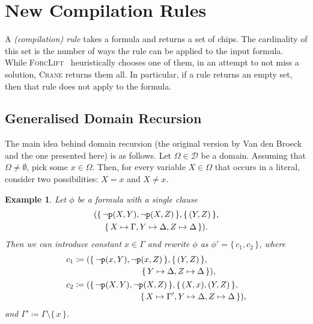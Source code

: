 \documentclass{article}
\newtheorem{example}{Example}
\newcommand{\predicate}{\texttt{\textup{p}}}
\begin{document}
\section{New Compilation Rules}\label{sec:rules}

A \emph{(compilation) rule} takes a formula and returns a set of chips. The
cardinality of this set is the number of ways the rule can be applied to the
input formula. While \textsc{ForcLift}~\cite{DBLP:conf/ijcai/BroeckTMDR11}
heuristically chooses one of them, in an attempt to not miss a solution,
\textsc{Crane} returns them all. In particular, if a rule returns an empty set,
then that rule does not apply to the formula.

\subsection{Generalised Domain Recursion}\label{sec:dr}

The main idea behind domain recursion (the original version by Van den
Broeck~ and the one presented here) is as
follows. Let $\Omega \in \mathcal{D}$ be a domain. Assuming that
$\Omega \ne \emptyset$, pick some $x \in \Omega$. Then, for every variable
$X \in \Omega$ that occurs in a literal, consider two possibilities: $X = x$ and
$X \ne x$.

\begin{example}\label{example:dr}
  Let $\phi$ be a formula with a single clause
  \begin{multline*}
    (\{\, \neg \predicate(X, Y), \neg \predicate(X, Z) \,\}, \{\, (Y, Z) \,\}, \\
    \{\, X \mapsto \Gamma, Y \mapsto \Delta, Z \mapsto \Delta \,\}).
  \end{multline*}
  Then we can introduce constant $x \in \Gamma$ and rewrite $\phi$ as
  $\phi' = \{\, c_{1}, c_{2} \,\}$, where
  \begin{align*}
    c_{1} &\coloneqq \begin{multlined}[t]
      (\{\, \neg \predicate(x, Y), \neg \predicate(x, Z) \,\}, \{\, (Y, Z) \,\}, \\
      \{\, Y \mapsto \Delta, Z \mapsto \Delta \,\}),
      \end{multlined}\\
    c_{2} &\coloneqq \begin{multlined}[t]
      (\{\, \neg \predicate(X, Y), \neg \predicate(X, Z) \,\}, \{\, (X, x), (Y, Z) \,\}, \\
      \{\, X \mapsto \Gamma', Y \mapsto \Delta, Z \mapsto \Delta \,\}),
      \end{multlined}
  \end{align*}
  and $\Gamma' \coloneqq \Gamma \setminus \{\, x \,\}$.
\end{example}
\end{document}
